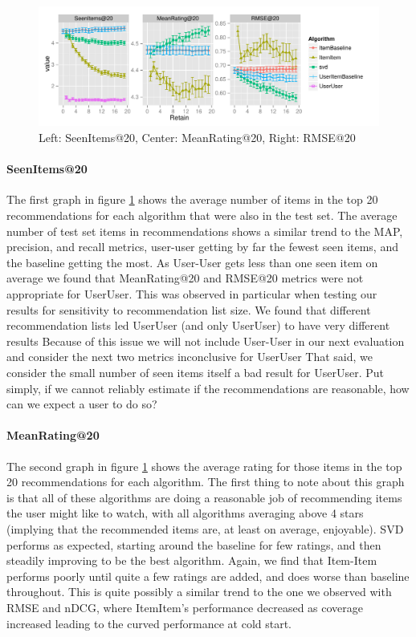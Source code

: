 \documentclass[letterpaper]{sig-alternate}
\begin{document}

\begin{figure}[ht!]
  \centering
  \includegraphics[width=1.05\linewidth]{../lenskit/output/ekstrandTuned20/rmse_20.pdf}
  \caption{Left: SeenItems@20, Center: MeanRating@20, Right: RMSE@20}
  \label{fig:topN.rmse}
\end{figure}
  \paragraph{SeenItems@20}
  The first graph in figure \ref{fig:topN.rmse} shows the average number of items in the top 20 recommendations for each algorithm that were also in the test set.
  The average number of test set items in recommendations shows a similar trend to the MAP, precision, and recall metrics, user-user getting by far the fewest seen items, and the baseline getting the most.
  As User-User gets less than one seen item on average we found that MeanRating@20 and RMSE@20 metrics were not appropriate for UserUser.
  This was observed in particular when testing our results for sensitivity to recommendation list size.
  We found that different recommendation lists led UserUser (and only UserUser) to have very different results
  Because of this issue we will not include User-User in our next evaluation and consider the next two metrics inconclusive for UserUser
  That said, we consider the small number of seen items itself a bad result for UserUser.
  Put simply, if we cannot reliably estimate if the recommendations are reasonable, how can we expect a user to do so?

  \paragraph{MeanRating@20}
  The second graph in figure \ref{fig:topN.rmse} shows the average rating for those items in the top 20 recommendations for each algorithm.
  The first thing to note about this graph is that all of these algorithms are doing a reasonable job of recommending items the user might like to watch, with all algorithms averaging above 4 stars (implying that the recommended items are, at least on average, enjoyable).
  SVD performs as expected, starting around the baseline for few ratings, and then steadily improving to be the best algorithm.
  Again, we find that Item-Item performs poorly until quite a few ratings are added, and does worse than baseline throughout.
  This is quite possibly a similar trend to the one we observed with RMSE and nDCG, where ItemItem's performance decreased as coverage increased leading to the curved performance at cold start.
    
\end{document}

